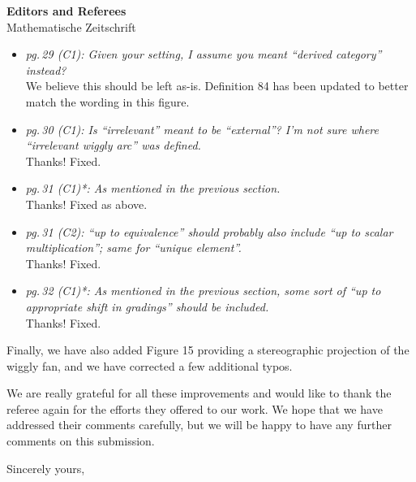 \documentclass{letter}
\begin{document}
\begin{letter}{{\bf Editors and Referees} \\ Mathematische Zeitschrift}
\begin{itemize}
\item \textsl{\color{gray} pg.\,29 (C1): Given your setting, I assume you meant ``derived category'' instead?} \\
We believe this should be left as-is. Definition 84 has been updated to better match the wording in this figure.

\item \textsl{\color{gray} pg.\,30 (C1): Is ``irrelevant'' meant to be ``external''? I’m not sure where ``irrelevant wiggly arc'' was defined.} \\
Thanks! Fixed.

\item \textsl{\color{gray} pg.\,31 (C1)*: As mentioned in the previous section.} \\
Thanks! Fixed as above.

\item \textsl{\color{gray} pg.\,31 (C2): ``up to equivalence'' should probably also include ``up to scalar multiplication''; same for ``unique element''.} \\
Thanks! Fixed.

\item \textsl{\color{gray} pg.\,32 (C1)*: As mentioned in the previous section, some sort of ``up to appropriate shift in gradings'' should be included.} \\
Thanks! Fixed.

\end{itemize}

Finally, we have also added Figure 15 providing a stereographic projection of the wiggly fan, and we have corrected a few additional typos.

We are really grateful for all these improvements and would like to thank the referee again for the efforts they offered to our work. We hope that we have addressed their comments carefully, but we will be happy to have any further comments on this submission.

%

\closing{Sincerely yours,}

\end{letter}
\end{document}
